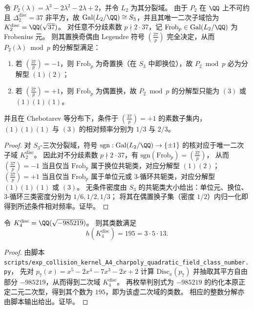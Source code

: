 \begin{proposition}\label{prop:pom-p2-frobenius-parity-sieve}
令 \(P_2(\lambda)=\lambda^3-2\lambda^2-2\lambda+2\)，并令 \(L_2\) 为其分裂域。
由于 \(P_2\) 在 \(\QQ\) 上不可约且 \(\Delta_2^{\mathrm{disc}}=37\) 非平方，故
\(\mathrm{Gal}(L_2/\QQ)\cong S_3\)，并且其唯一二次子域恰为
\(
K_2^{\mathrm{disc}}=\QQ(\sqrt{37})
\)。
对任意不分歧素数 \(p\nmid 2\cdot 37\)，记 \(\mathrm{Frob}_p\in \mathrm{Gal}(L_2/\QQ)\) 为 Frobenius 元。
则其置换奇偶由 Legendre 符号 \(\left(\frac{37}{p}\right)\) 完全决定，从而 \(P_2(\lambda)\bmod p\) 的分解型满足：
\begin{enumerate}
  \item 若 \(\left(\frac{37}{p}\right)=-1\)，则 \(\mathrm{Frob}_p\) 为奇置换（在 \(S_3\) 中即换位），故 \(P_2\bmod p\) 必为分解型 \((1)(2)\)；
  \item 若 \(\left(\frac{37}{p}\right)=+1\)，则 \(\mathrm{Frob}_p\) 为偶置换，故 \(P_2\bmod p\) 的分解型只能为 \((3)\) 或 \((1)(1)(1)\)。
\end{enumerate}
并且在 Chebotarev 等分布下，条件于 \(\left(\frac{37}{p}\right)=+1\) 的素数子集内，
\((1)(1)(1)\) 与 \((3)\) 的相对频率分别为 \(1/3\) 与 \(2/3\)。
\end{proposition}
\begin{proof}
对 \(S_3\)-三次分裂域，符号 \(\mathrm{sgn}:\mathrm{Gal}(L_2/\QQ)\to\{\pm 1\}\) 的核对应于唯一二次子域 \(K_2^{\mathrm{disc}}\)。
因此对不分歧素数 \(p\nmid 2\cdot 37\)，有
\(
\mathrm{sgn}(\mathrm{Frob}_p)=\left(\frac{37}{p}\right)
\)，
从而 \(\left(\frac{37}{p}\right)=-1\) 当且仅当 \(\mathrm{Frob}_p\) 属于换位共轭类，对应分解型 \((1)(2)\)；
\(\left(\frac{37}{p}\right)=+1\) 当且仅当 \(\mathrm{Frob}_p\) 属于单位元或 \(3\)-循环共轭类，对应分解型 \((1)(1)(1)\) 或 \((3)\)。
无条件密度由 \(S_3\) 的共轭类大小给出：单位元、换位、\(3\)-循环三类密度分别为 \(1/6,1/2,1/3\)；
将其在偶置换子集（密度 \(1/2\)）内归一化即得到所述条件相对频率。证毕。
\end{proof}

\begin{proposition}[\texorpdfstring{$K_4^{\mathrm{disc}}=\QQ(\sqrt{-985219})$}{K4disc} 的类数证书：\(h=195\)]\label{prop:pom-a4-disc-quadratic-class-number}
令 \(K_4^{\mathrm{disc}}=\QQ(\sqrt{-985219})\)。
则其类数满足
\[
h(K_4^{\mathrm{disc}})=195=3\cdot 5\cdot 13.
\]
\end{proposition}
\begin{proof}
由脚本 \texttt{scripts/exp\_collision\_kernel\_A4\_charpoly\_quadratic\_field\_class\_number.py}，
先对 \(p_7(x)=x^5-2x^4-7x^3-2x+2\) 计算 \(\mathrm{Disc}_x(p_7)\) 并抽取其平方自由部分 \(-985219\)，从而得到二次域 \(K_4^{\mathrm{disc}}\)。
再枚举判别式为 \(-985219\) 的约化本原正定二元二次型，得到其个数为 \(195\)，即为该虚二次域的类数。
相应的整数分解亦由脚本输出给出。证毕。
\end{proof}
